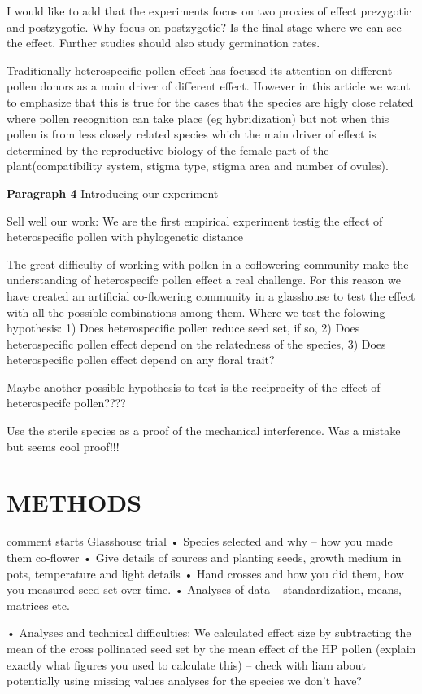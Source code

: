 \documentclass[11pt,a4paper]{article}
\begin{document}
I would like to add that the experiments focus on two proxies of effect
prezygotic and postzygotic. Why focus on postzygotic? Is the final stage
where we can see the effect. Further studies should also study
germination rates.

Traditionally heterospecific pollen effect has focused its attention on
different pollen donors as a main driver of different effect. However in
this article we want to emphasize that this is true for the cases that
the species are higly close related where pollen recognition can take
place (eg hybridization) but not when this pollen is from less closely
related species which the main driver of effect is determined by the
reproductive biology of the female part of the plant(compatibility
system, stigma type, stigma area and number of ovules).

\textbf{Paragraph 4} Introducing our experiment

Sell well our work: We are the first empirical experiment testig the
effect of heterospecific pollen with phylogenetic distance

The great difficulty of working with pollen in a coflowering community
make the understanding of heterospecifc pollen effect a real challenge.
For this reason we have created an artificial co-flowering community in
a glasshouse to test the effect with all the possible combinations among
them. Where we test the folowing hypothesis: 1) Does heterospecific
pollen reduce seed set, if so, 2) Does heterospecific pollen effect
depend on the relatedness of the species, 3) Does heterospecific pollen
effect depend on any floral trait?

Maybe another possible hypothesis to test is the reciprocity of the
effect of heterospecifc pollen????

Use the sterile species as a proof of the mechanical interference. Was a
mistake but seems cool proof!!!

\section{METHODS}\label{methods}

\href{}{comment starts} Glasshouse trial • Species selected and why --
how you made them co-flower • Give details of sources and planting
seeds, growth medium in pots, temperature and light details • Hand
crosses and how you did them, how you measured seed set over time. •
Analyses of data -- standardization, means, matrices etc.

• Analyses and technical difficulties: We calculated effect size by
subtracting the mean of the cross pollinated seed set by the mean effect
of the HP pollen (explain exactly what figures you used to calculate
this) -- check with liam about potentially using missing values analyses
for the species we don't have?
\end{document}
